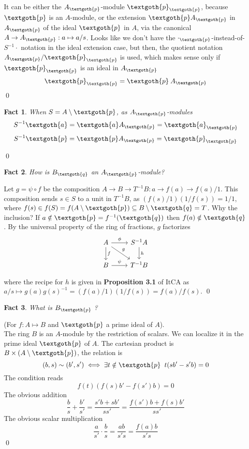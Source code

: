 \documentclass{article}
\newtheorem{theorem}{Fact}[section]
\begin{document}
\noindent
It can be either the $A_\textgoth{p}$-module $\textgoth{p}_\textgoth{p}$, because $\textgoth{p}$ is an $A$-module, or the extension $\textgoth{p} A_\textgoth{p}$ in $A_\textgoth{p}$ of the ideal $\textgoth{p}$ in $A$, via the canonical $A \rightarrow A_\textgoth{p} : a \mapsto a/s$. Looks like we don't have the $\cdot_\textgoth{p}$-instead-of-$S^{-1} \cdot$ notation in the ideal extension case, but then, the quotient notation $ A_\textgoth{p} / \textgoth{p}_\textgoth{p}$ is used, which makes sense only if $\textgoth{p}_\textgoth{p}$ is an ideal in $A_\textgoth{p}$
\[
   \textgoth{p}_\textgoth{p} = \textgoth{p} \: A_\textgoth{p}
\]
\qed
\begin{theorem}
When $S=A \setminus \textgoth{p}$, as $A_\textgoth{p}$-modules
\[
S^{-1}\textgoth{a} = \textgoth{a}A_\textgoth{p} = \textgoth{a}_\textgoth{p} 
\]
\[
S^{-1}\textgoth{p} = \textgoth{p}A_\textgoth{p} = \textgoth{p}_\textgoth{p} 
\]
\end{theorem}
\qed

\begin{theorem}
\label{b_q_as_a_q}
How is $B_\textgoth{q}$ an $A_\textgoth{p}$-module?
\end{theorem}

\noindent
Let $g = \psi \circ f$ be the composition $A \rightarrow B \rightarrow T^{-1}B : a \rightarrow f(a) \rightarrow f(a)/1 $. This composition sends $s \in S$ to a unit in $T^{-1}B$, as $(f(s)/1)(1/f(s)) = 1/1$, where $f(s) \in f(S) = f(A \setminus \textgoth{p}) \subseteq B \setminus \textgoth{q} = T$. Why the inclusion? If $a \notin \textgoth{p} = f^{-1}(\textgoth{q})$ then $f(a) \notin \textgoth{q}$. By the universal property of the ring of fractions, $g$ factorizes
\[
     \begin{tikzcd}
     A \arrow{r}{\phi} \arrow{d}{f} \arrow{dr}{g} & S^{-1}A \arrow{d}{h} \\
     B \arrow{r}{\psi} & T^{-1}B
     \end{tikzcd}
\]

\noindent
where the recipe for $h$ is given in \textbf{Proposition 3.1} of ItCA as $a/s \mapsto g(a)g(s)^{-1} = (f(a)/1)(1/f(s)) = f(a)/f(s)$.
\qed

\begin{theorem}
What is $B_\textgoth{p}$ ?
\end{theorem}

\noindent
(For $f: A \mapsto B$ and $\textgoth{p}$ a prime ideal of $A$). \\
The ring $B$ is an $A$-module by the restriction of scalars. We can localize it in the prime ideal $\textgoth{p}$  of $A$. The cartesian product is $B \times (A \setminus \textgoth{p})$, the relation is 
\[
(b, s) \sim (b', s') \iff \exists t \notin \textgoth{p} \; \; t(sb' - s'b) = 0
\]
The condition reads
\[
f(t)(f(s)b' - f(s')b) = 0
\]
The obvious addition 
\[
\frac{b}{s} + \frac{b'}{s'} = \frac{s'b + sb'}{ss'} = \frac{f(s')b + f(s)b'}{ss'}
\]
The obvious scalar multiplication
\[
\frac{a}{s'} \cdot \frac{b}{s} = \frac{ab}{s's} = \frac{f(a)b}{s's}
\]
\qed
\end{document}
